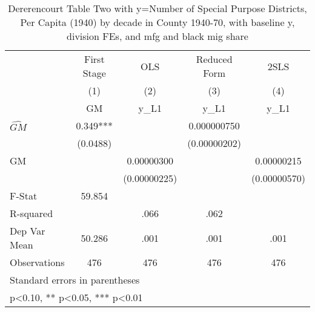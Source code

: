 \begin{table}[htbp]\centering
\def\sym#1{\ifmmode^{#1}\else\(^{#1}\)\fi}
\caption{Dererencourt Table Two with y=Number of Special Purpose Districts, Per Capita (1940) by decade in County 1940-70, with baseline y, division FEs, and mfg and black mig share}
\begin{tabular}{l*{4}{c}}
\toprule
                    & First Stage   &         OLS   &Reduced Form   &        2SLS   \\
                    &\multicolumn{1}{c}{(1)}&\multicolumn{1}{c}{(2)}&\multicolumn{1}{c}{(3)}&\multicolumn{1}{c}{(4)}\\
                    &\multicolumn{1}{c}{GM}&\multicolumn{1}{c}{y\_L1}&\multicolumn{1}{c}{y\_L1}&\multicolumn{1}{c}{y\_L1}\\
\midrule
$\hat{GM}$          &       0.349***&               & 0.000000750   &               \\
                    &    (0.0488)   &               &(0.00000202)   &               \\
\addlinespace
GM                  &               &  0.00000300   &               &  0.00000215   \\
                    &               &(0.00000225)   &               &(0.00000570)   \\
\midrule
F-Stat              &      59.854   &               &               &               \\
R-squared           &               &        .066   &        .062   &               \\
Dep Var Mean        &      50.286   &        .001   &        .001   &        .001   \\
Observations        &         476   &         476   &         476   &         476   \\
\bottomrule
\multicolumn{5}{l}{\footnotesize Standard errors in parentheses}\\
\multicolumn{5}{l}{\footnotesize * p<0.10, ** p<0.05, *** p<0.01}\\
\end{tabular}
\end{table}
